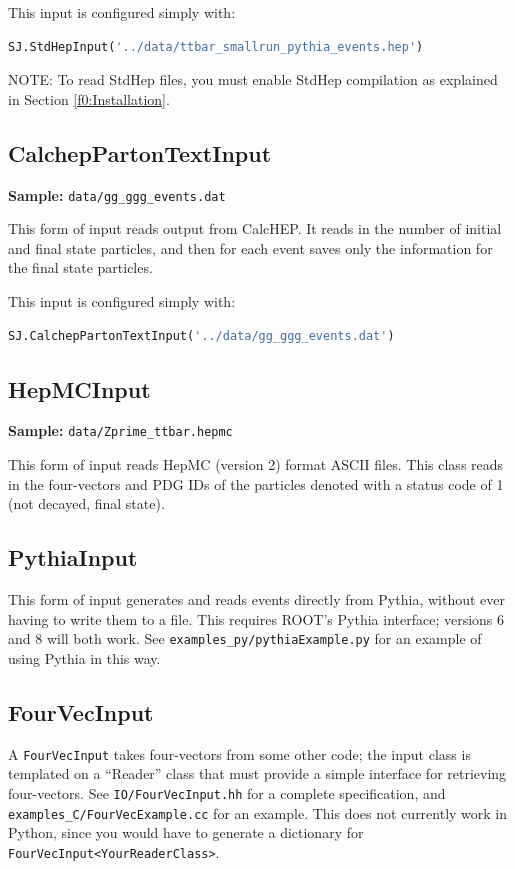\documentclass{article}
\newcommand{\prog}[1]{{\sc #1}\xspace}
\newcommand{\code}[1]{{\tt #1}\xspace}
\begin{document}
This input is configured simply with:
\begin{lstlisting}[language=Python]
SJ.StdHepInput('../data/ttbar_smallrun_pythia_events.hep')
\end{lstlisting}

NOTE: To read StdHep files, you must enable StdHep compilation as explained in Section \ref{f0:Installation}.

\subsection{CalchepPartonTextInput}
{\bf Sample:} \verb+data/gg_ggg_events.dat+

This form of input reads output from CalcHEP. It reads in the number of
initial and final state particles, and then for each event saves only
the information for the final state particles.

This input is configured simply with:
\begin{lstlisting}[language=Python]
SJ.CalchepPartonTextInput('../data/gg_ggg_events.dat')
\end{lstlisting}

\subsection{HepMCInput}
{\bf Sample:} \verb+data/Zprime_ttbar.hepmc+

This form of input reads HepMC (version 2) format ASCII files.  This class reads in the four-vectors and PDG IDs of the particles denoted with a status code of 1 (not decayed, final state).

\subsection{PythiaInput}

This form of input generates and reads events directly from \prog{Pythia}, without ever having to write them to a file.  This requires \prog{ROOT}'s \prog{Pythia} interface; versions 6 and 8 will both work.  See \verb+examples_py/pythiaExample.py+ for an example of using \prog{Pythia} in this way.

\subsection{FourVecInput}

A \code{FourVecInput} takes four-vectors from some other code; the input class is templated on a ``Reader'' class that must provide a simple interface for retrieving four-vectors.  See \verb+IO/FourVecInput.hh+ for a complete specification, and \verb+examples_C/FourVecExample.cc+ for an example.  This does not currently work in Python, since you would have to generate a dictionary for \code{FourVecInput<YourReaderClass>}.
\end{document}
